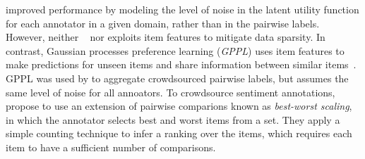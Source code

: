 \citet{wang2016blind} improved performance 
by modeling the level of noise in the latent utility function for each annotator in a given domain, rather than
in the pairwise labels. 
However, neither ~\citet{chen2013pairwise} nor \citet{wang2016blind}
exploits item features to mitigate data sparsity.
In contrast, Gaussian processes preference learning (\emph{GPPL})
uses item features to make predictions for unseen items and
share information between similar items~\citep{chu2005preference}.
GPPL was used by \citet{simpson2018finding} to aggregate crowdsourced pairwise labels,
but assumes the same level of noise for all annoators.
To crowdsource sentiment annotations, 
\citet{kiritchenko2016capturing} propose to use an extension of pairwise comparions
known as \emph{best-worst scaling}, in which the annotator selects best and worst items from a set.
They apply a simple counting technique to infer a ranking over the items, which requires 
each item to have a sufficient number of comparisons.


